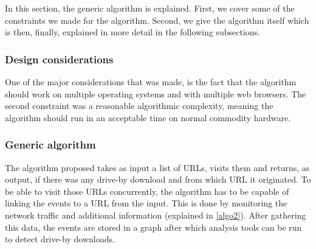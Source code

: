 
In this section, the generic algorithm is explained. First, we cover some of the constraints we made for the algorithm. Second, we give the algorithm itself which is then, finally, explained in more detail in the following subsections.


\subsubsection{Design considerations}

One of the major considerations that was made, is the fact that the algorithm should work on multiple operating systems and with multiple web browsers. The second constraint was a reasonable algorithmic complexity, meaning the algorithm should run in an acceptable time on normal commodity hardware.





\subsubsection{Generic algorithm}

The algorithm proposed takes as input a list of URLs, visits them and returns, as output, if there was any drive-by download and from which URL it originated. To be able to visit those URLs concurrently, the algorithm has to be capable of linking the events to a URL from the input. This is done by monitoring the network traffic and additional information (explained in \ref{algo2}). After gathering this data, the events are stored in a graph after which analysis tools can be run to detect drive-by downloads.


